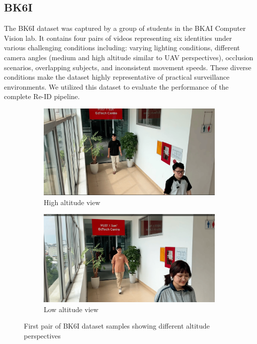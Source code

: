 \subsection{BK6I}
\label{sec:bk6i}

The BK6I dataset was captured by a group of students in the BKAI Computer Vision lab. It contains four pairs of videos representing six identities under various challenging conditions including: varying lighting conditions, different camera angles (medium and high altitude similar to UAV perspectives), occlusion scenarios, overlapping subjects, and inconsistent movement speeds. These diverse conditions make the dataset highly representative of practical surveillance environments. We utilized this dataset to evaluate the performance of the complete Re-ID pipeline.

\begin{figure}[htbp]
    \centering
    \begin{subfigure}[b]{0.48\textwidth}
        \centering
        \includegraphics[width=\textwidth]{Figure/edtech_high.png}
        \caption{High altitude view}
        \label{fig:edtech_high1}
    \end{subfigure}
    \hfill
    \begin{subfigure}[b]{0.48\textwidth}
        \centering
        \includegraphics[width=\textwidth]{Figure/edtech_low.png}
        \caption{Low altitude view}
        \label{fig:edtech_low1}
    \end{subfigure}
    \caption{First pair of BK6I dataset samples showing different altitude perspectives}
    \label{fig:bk6i_pair1}
\end{figure}

